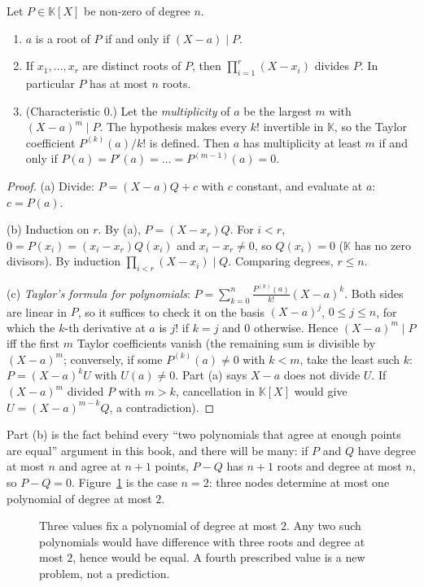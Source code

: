 \begin{proposition}[roots]\label{prop:rootsfactor}
Let $P\in\mathbb K[X]$ be non-zero of degree $n$.
\begin{enumerate}[label=(\alph*)]
\item $a$ is a root of $P$ if and only if $(X-a)\mid P$.
\item If $x_1,\dots,x_r$ are distinct roots of $P$, then $\prod_{i=1}^r(X-x_i)$ divides $P$. In particular $P$ has at most $n$ roots.
\item (Characteristic $0$.) Let the \emph{multiplicity} of $a$ be the largest $m$ with $(X-a)^m\mid P$. The hypothesis makes every $k!$ invertible in $\mathbb K$, so the Taylor coefficient $P^{(k)}(a)/k!$ is defined. Then $a$ has multiplicity at least $m$ if and only if $P(a)=P'(a)=\dots=P^{(m-1)}(a)=0$.
\end{enumerate}
\end{proposition}
\begin{proof}
(a) Divide: $P=(X-a)Q+c$ with $c$ constant, and evaluate at $a$: $c=P(a)$.

(b) Induction on $r$. By (a), $P=(X-x_r)Q$. For $i<r$, $0=P(x_i)=(x_i-x_r)Q(x_i)$ and $x_i-x_r\ne0$, so $Q(x_i)=0$ ($\mathbb K$ has no zero divisors). By induction $\prod_{i<r}(X-x_i)\mid Q$. Comparing degrees, $r\le n$.

(c) \emph{Taylor's formula for polynomials}: $P=\sum_{k=0}^n\frac{P^{(k)}(a)}{k!}(X-a)^k$. Both sides are linear in $P$, so it suffices to check it on the basis $(X-a)^j$, $0\le j\le n$, for which the $k$-th derivative at $a$ is $j!$ if $k=j$ and $0$ otherwise. Hence $(X-a)^m\mid P$ iff the first $m$ Taylor coefficients vanish (the remaining sum is divisible by $(X-a)^m$; conversely, if some $P^{(k)}(a)\ne0$ with $k<m$, take the least such $k$: $P=(X-a)^kU$ with $U(a)\ne0$. Part (a) says $X-a$ does not divide $U$. If $(X-a)^m$ divided $P$ with $m>k$, cancellation in $\mathbb K[X]$ would give $U=(X-a)^{m-k}Q$, a contradiction).
\end{proof}

Part (b) is the fact behind every ``two polynomials that agree at enough points are equal'' argument in this book, and there will be many: if
$P$ and $Q$ have degree at most $n$ and agree at $n+1$ points, $P-Q$ has $n+1$ roots and degree at most $n$, so $P-Q=0$. Figure~\ref{fig:threepoints} is the case $n=2$: three nodes determine at most one polynomial of degree at most $2$.

\begin{figure}[ht]
\centering
{}
\caption{Three values fix a polynomial of degree at most $2$. Any two such polynomials would have difference with three roots and degree at most $2$, hence would be equal. A fourth prescribed value is a new problem, not a prediction.}
\label{fig:threepoints}
\end{figure}

